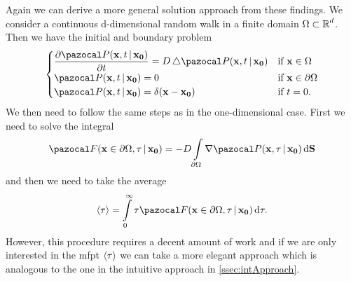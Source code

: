 \bigskip

\noindent Again we can derive a more general solution approach from these findings. We consider a continuous d-dimensional random walk in a finite domain $\Omega \subset \operatorname{\mathbb{R}}^d$. Then we have the initial and boundary problem
\begin{equation*}
 \begin{cases}
  \dfrac{\partial \P(\bv{x}, t \,|\, \bv{x_0})}{\partial t} = D \Laplace \P(\bv{x}, t \,|\, \bv{x_0}) & \textrm{if } \bv{x} \in \Omega \\
  \P(\bv{x},t \,|\, \bv{x_0}) = 0 & \textrm{if } \bv{x} \in \partial \Omega \\
  \P(\bv{x},t \,|\, \bv{x_0}) = \delta(\bv{x}-\bv{x_0}) & \textrm{if } t = 0.
 \end{cases}
\end{equation*}
We then need to follow the same steps as in the one-dimensional case. First we need to solve the integral
\begin{equation*}
 \F(\bv{x} \in \partial \Omega, \tau \,|\, \bv{x_0}) = -D\int\limits_{\partial \Omega} \nabla \P(\bv{x}, \tau \,|\, \bv{x_0}) \diff \bv{S}
\end{equation*}
and then we need to take the average
\begin{equation*}
 \mfpt = \int\limits_0^\infty \tau \F(\bv{x} \in \partial \Omega, \tau \,|\, \bv{x_0}) \diff \tau.
\end{equation*}
However, this procedure requires a decent amount of work and if we are only interested in the \ac{mfpt} $\left<\tau\right>$ we can take a more elegant approach which is analogous to the one in the intuitive approach in \autoref{ssec:intApproach}.

